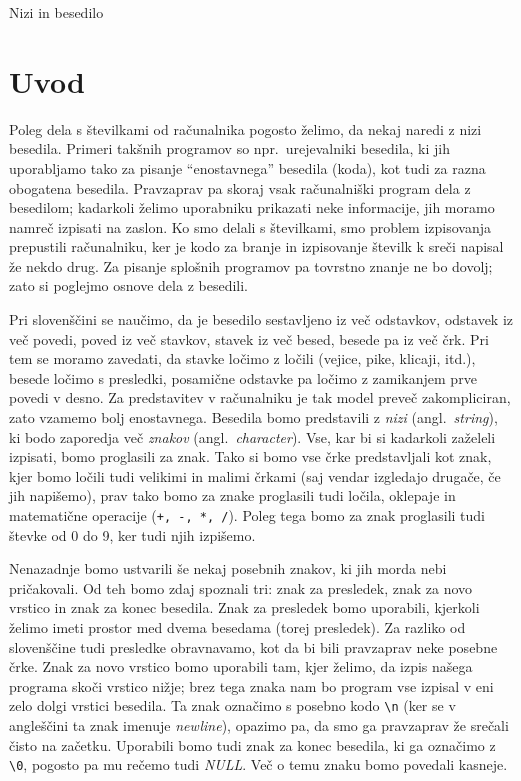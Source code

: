 
Nizi in besedilo


\section{Uvod}

Poleg dela s številkami od računalnika pogosto želimo, da nekaj naredi z nizi
besedila.
Primeri takšnih programov so npr.~urejevalniki besedila, ki jih uporabljamo tako
za pisanje ``enostavnega'' besedila (koda), kot tudi za razna obogatena
besedila.
Pravzaprav pa skoraj vsak računalniški program dela z besedilom; kadarkoli
želimo uporabniku prikazati neke informacije, jih moramo namreč izpisati na
zaslon.
Ko smo delali s številkami, smo problem izpisovanja prepustili računalniku, ker
je kodo za branje in izpisovanje številk k sreči napisal že nekdo drug.
Za pisanje splošnih programov pa tovrstno znanje ne bo dovolj; zato si poglejmo
osnove dela z besedili.

Pri slovenščini se naučimo, da je besedilo sestavljeno iz več odstavkov,
odstavek iz več povedi, poved iz več stavkov, stavek iz več besed, besede pa iz
več črk.
Pri tem se moramo zavedati, da stavke ločimo z ločili (vejice, pike, klicaji,
itd.), besede ločimo s presledki, posamične odstavke pa ločimo z zamikanjem prve
povedi v desno.
Za predstavitev v računalniku je tak model preveč zakompliciran, zato vzamemo
bolj enostavnega.
Besedila bomo predstavili z \textit{nizi} (angl.~\textit{string}), ki bodo
zaporedja več \textit{znakov} (angl.~\textit{character}).
Vse, kar bi si kadarkoli zaželeli izpisati, bomo proglasili za znak.
Tako si bomo vse črke predstavljali kot znak, kjer bomo ločili tudi velikimi in
malimi črkami (saj vendar izgledajo drugače, če jih napišemo), prav tako bomo za
znake proglasili tudi ločila, oklepaje in matematične operacije
(\verb|+, -, *, /|).
Poleg tega bomo za znak proglasili tudi števke od 0 do 9, ker tudi njih
izpišemo.

Nenazadnje bomo ustvarili še nekaj posebnih znakov, ki jih morda nebi
pričakovali.
Od teh bomo zdaj spoznali tri: znak za presledek, znak za novo vrstico in znak
za konec besedila.
Znak za presledek bomo uporabili, kjerkoli želimo imeti prostor med dvema
besedama (torej presledek).
Za razliko od slovenščine tudi presledke obravnavamo, kot da bi bili pravzaprav
neke posebne črke.
Znak za novo vrstico bomo uporabili tam, kjer želimo, da izpis našega programa
skoči vrstico nižje; brez tega znaka nam bo program vse izpisal v eni zelo dolgi
vrstici besedila.
Ta znak označimo s posebno kodo \verb+\n+ (ker se v angleščini ta znak imenuje
\textit{newline}), opazimo pa, da smo ga pravzaprav že srečali čisto na začetku.
Uporabili bomo tudi znak za konec besedila, ki ga označimo z \verb+\0+,
pogosto pa mu rečemo tudi \textit{NULL}.
Več o temu znaku bomo povedali kasneje.


